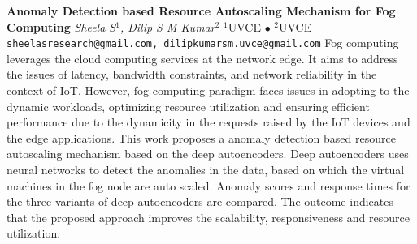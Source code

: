 
    \begin{conf-abstract}[]
        {\textbf{Anomaly Detection based Resource Autoscaling Mechanism for Fog Computing}}
        {\textit{Sheela S$^{1}$, Dilip  S M Kumar$^{2}$}}
        {$^{1}$UVCE $\bullet$ $^{2}$UVCE}
        {\texttt{sheelasresearch@gmail.com, dilipkumarsm.uvce@gmail.com}}
        {Fog computing leverages the cloud computing services at the network edge. It aims to address the issues of latency, bandwidth constraints, and network reliability in the context of IoT. However, fog computing paradigm faces issues in adopting to the dynamic workloads, optimizing resource utilization and ensuring efficient performance due to the dynamicity in the requests raised by the IoT devices and the edge applications. This work proposes a anomaly detection based resource autoscaling mechanism based on the deep autoencoders. Deep autoencoders uses neural networks to detect the anomalies in the data, based on which the virtual machines in the fog node are auto scaled. Anomaly scores and response times for the three variants of deep autoencoders are compared. The outcome indicates that the proposed approach improves the scalability, responsiveness and resource utilization.}
    \end{conf-abstract}
        